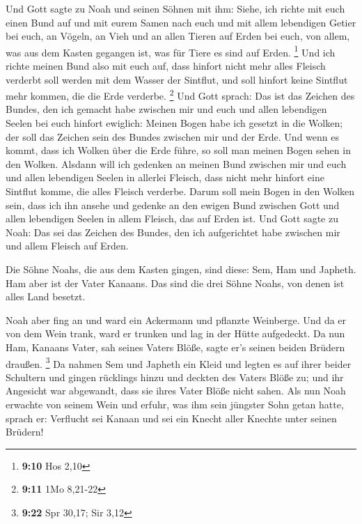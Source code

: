  Und Gott sagte zu Noah und seinen Söhnen mit ihm:
 Siehe, ich richte mit euch einen Bund auf und mit eurem
Samen nach euch  und mit allem lebendigen Getier bei euch,
an Vögeln, an Vieh und an allen Tieren auf Erden bei euch, von allem,
was aus dem Kasten gegangen ist, was für Tiere es sind auf Erden.
\footnote{\textbf{9:10} Hos 2,10}  Und ich richte meinen
Bund also mit euch auf, dass hinfort nicht mehr alles Fleisch verderbt
soll werden mit dem Wasser der Sintflut, und soll hinfort keine Sintflut
mehr kommen, die die Erde verderbe. \footnote{\textbf{9:11} 1Mo 8,21-22}
 Und Gott sprach: Das ist das Zeichen des Bundes, den ich
gemacht habe zwischen mir und euch und allen lebendigen Seelen bei euch
hinfort ewiglich:  Meinen Bogen habe ich gesetzt in die
Wolken; der soll das Zeichen sein des Bundes zwischen mir und der Erde.
 Und wenn es kommt, dass ich Wolken über die Erde führe, so
soll man meinen Bogen sehen in den Wolken.  Alsdann will
ich gedenken an meinen Bund zwischen mir und euch und allen lebendigen
Seelen in allerlei Fleisch, dass nicht mehr hinfort eine Sintflut komme,
die alles Fleisch verderbe.  Darum soll mein Bogen in den
Wolken sein, dass ich ihn ansehe und gedenke an den ewigen Bund zwischen
Gott und allen lebendigen Seelen in allem Fleisch, das auf Erden ist.
 Und Gott sagte zu Noah: Das sei das Zeichen des Bundes,
den ich aufgerichtet habe zwischen mir und allem Fleisch auf Erden.

 Die Söhne Noahs, die aus dem Kasten gingen, sind diese:
Sem, Ham und Japheth. Ham aber ist der Vater Kanaans.  Das
sind die drei Söhne Noahs, von denen ist alles Land besetzt.

 Noah aber fing an und ward ein Ackermann und pflanzte
Weinberge.  Und da er von dem Wein trank, ward er trunken
und lag in der Hütte aufgedeckt.  Da nun Ham, Kanaans
Vater, sah seines Vaters Blöße, sagte er's seinen beiden Brüdern
draußen. \footnote{\textbf{9:22} Spr 30,17; Sir 3,12}  Da
nahmen Sem und Japheth ein Kleid und legten es auf ihrer beider
Schultern und gingen rücklings hinzu und deckten des Vaters Blöße zu;
und ihr Angesicht war abgewandt, dass sie ihres Vater Blöße nicht sahen.
 Als nun Noah erwachte von seinem Wein und erfuhr, was ihm
sein jüngster Sohn getan hatte,  sprach er: Verflucht sei
Kanaan und sei ein Knecht aller Knechte unter seinen Brüdern!

